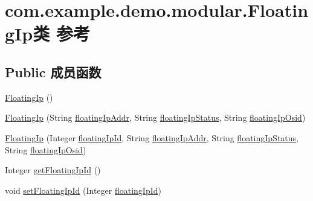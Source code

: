 \hypertarget{classcom_1_1example_1_1demo_1_1modular_1_1_floating_ip}{}\section{com.\+example.\+demo.\+modular.\+Floating\+Ip类 参考}
\label{classcom_1_1example_1_1demo_1_1modular_1_1_floating_ip}
\subsection*{Public 成员函数}
\begin{DoxyCompactItemize}
\item 
\mbox{\hyperlink{classcom_1_1example_1_1demo_1_1modular_1_1_floating_ip_a6e262026cd900247d96b5b283f91090f}{Floating\+Ip}} ()
\item 
\mbox{\hyperlink{classcom_1_1example_1_1demo_1_1modular_1_1_floating_ip_a4dbe95597377fb46d9c2a12b94b892a9}{Floating\+Ip}} (String \mbox{\hyperlink{classcom_1_1example_1_1demo_1_1modular_1_1_floating_ip_a99d3efa58c7e2ac361388361e44bd308}{floating\+Ip\+Addr}}, String \mbox{\hyperlink{classcom_1_1example_1_1demo_1_1modular_1_1_floating_ip_a5775e23db8a5f08b9ea99ca9ed55be12}{floating\+Ip\+Status}}, String \mbox{\hyperlink{classcom_1_1example_1_1demo_1_1modular_1_1_floating_ip_a5e0179c3c33d52c9ccc8cba31bca659d}{floating\+Ip\+Osid}})
\item 
\mbox{\hyperlink{classcom_1_1example_1_1demo_1_1modular_1_1_floating_ip_affffabb4f2fbf15ac372d46a4a98928b}{Floating\+Ip}} (Integer \mbox{\hyperlink{classcom_1_1example_1_1demo_1_1modular_1_1_floating_ip_aa2c129cf0eb591fe4e1c3b461d7edb31}{floating\+Ip\+Id}}, String \mbox{\hyperlink{classcom_1_1example_1_1demo_1_1modular_1_1_floating_ip_a99d3efa58c7e2ac361388361e44bd308}{floating\+Ip\+Addr}}, String \mbox{\hyperlink{classcom_1_1example_1_1demo_1_1modular_1_1_floating_ip_a5775e23db8a5f08b9ea99ca9ed55be12}{floating\+Ip\+Status}}, String \mbox{\hyperlink{classcom_1_1example_1_1demo_1_1modular_1_1_floating_ip_a5e0179c3c33d52c9ccc8cba31bca659d}{floating\+Ip\+Osid}})
\item 
Integer \mbox{\hyperlink{classcom_1_1example_1_1demo_1_1modular_1_1_floating_ip_afaf74eb880208ebe0d9c135c9020fc70}{get\+Floating\+Ip\+Id}} ()
\item 
void \mbox{\hyperlink{classcom_1_1example_1_1demo_1_1modular_1_1_floating_ip_a7db1f246e5074cb0c34387af7c04a79d}{set\+Floating\+Ip\+Id}} (Integer \mbox{\hyperlink{classcom_1_1example_1_1demo_1_1modular_1_1_floating_ip_aa2c129cf0eb591fe4e1c3b461d7edb31}{floating\+Ip\+Id}})

\end{DoxyCompactItemize}
